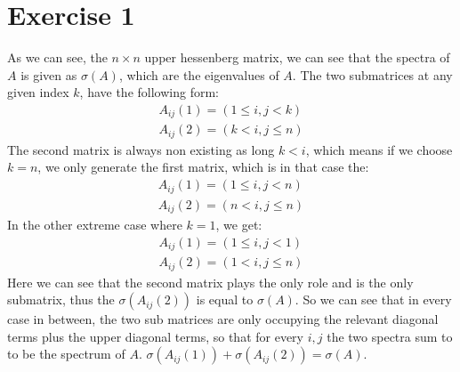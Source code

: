 \section{Exercise 1}
As we can see, the $n \times n$ upper hessenberg matrix, we can see that the spectra of $A$ is given as $\sigma(A)$, which are the eigenvalues of $A$. 
The two submatrices at any given index $k$, have the following form:
\begin{gather*}
A_{ij}(1) = ( 1 \leq i, j < k )\\
A_{ij}(2) = ( k < i , j \leq n)
\end{gather*}
The second matrix is always non existing as long $k < i$, which means if we choose $k = n$, we only generate the first matrix, which is in that case the:
\begin{gather*}
A_{ij}(1) =( 1 \leq i, j < n )\\
A_{ij}(2) = ( n < i , j \leq n)
\end{gather*}
In the other extreme case where $k=1$, we get:
\begin{gather*}
A_{ij}(1) =( 1 \leq i, j < 1 )\\
A_{ij}(2) = ( 1 < i , j \leq n)
\end{gather*}
Here we can see that the second matrix plays the only role and is the only submatrix, thus the $\sigma(A_{ij}(2))$ is equal to $\sigma(A)$.
So we can see that in every case in between, the two sub matrices are only occupying the relevant diagonal terms plus the upper diagonal terms, so that for every $i,j$ the two spectra sum to to be the spectrum of $A$. $\sigma(A_{ij}(1)) + \sigma(A_{ij}(2)) = \sigma(A)$.
